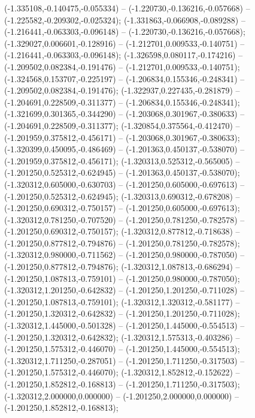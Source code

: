  (-1.335108,-0.140475,-0.055334) -- (-1.220730,-0.136216,-0.057668) -- (-1.225582,-0.209302,-0.025324);
 (-1.331863,-0.066908,-0.089288) -- (-1.216441,-0.063303,-0.096148) -- (-1.220730,-0.136216,-0.057668);
 (-1.329027,0.006601,-0.128916) -- (-1.212701,0.009533,-0.140751) -- (-1.216441,-0.063303,-0.096148);
 (-1.326598,0.080117,-0.174216) -- (-1.209502,0.082384,-0.191476) -- (-1.212701,0.009533,-0.140751);
 (-1.324568,0.153707,-0.225197) -- (-1.206834,0.155346,-0.248341) -- (-1.209502,0.082384,-0.191476);
 (-1.322937,0.227435,-0.281879) -- (-1.204691,0.228509,-0.311377) -- (-1.206834,0.155346,-0.248341);
 (-1.321699,0.301365,-0.344290) -- (-1.203068,0.301967,-0.380633) -- (-1.204691,0.228509,-0.311377);
 (-1.320854,0.375564,-0.412470) -- (-1.201959,0.375812,-0.456171) -- (-1.203068,0.301967,-0.380633);
 (-1.320399,0.450095,-0.486469) -- (-1.201363,0.450137,-0.538070) -- (-1.201959,0.375812,-0.456171);
 (-1.320313,0.525312,-0.565005) -- (-1.201250,0.525312,-0.624945) -- (-1.201363,0.450137,-0.538070);
 (-1.320312,0.605000,-0.630703) -- (-1.201250,0.605000,-0.697613) -- (-1.201250,0.525312,-0.624945);
 (-1.320313,0.690312,-0.678208) -- (-1.201250,0.690312,-0.750157) -- (-1.201250,0.605000,-0.697613);
 (-1.320312,0.781250,-0.707520) -- (-1.201250,0.781250,-0.782578) -- (-1.201250,0.690312,-0.750157);
 (-1.320312,0.877812,-0.718638) -- (-1.201250,0.877812,-0.794876) -- (-1.201250,0.781250,-0.782578);
 (-1.320312,0.980000,-0.711562) -- (-1.201250,0.980000,-0.787050) -- (-1.201250,0.877812,-0.794876);
 (-1.320312,1.087813,-0.686294) -- (-1.201250,1.087813,-0.759101) -- (-1.201250,0.980000,-0.787050);
 (-1.320312,1.201250,-0.642832) -- (-1.201250,1.201250,-0.711028) -- (-1.201250,1.087813,-0.759101);
 (-1.320312,1.320312,-0.581177) -- (-1.201250,1.320312,-0.642832) -- (-1.201250,1.201250,-0.711028);
 (-1.320312,1.445000,-0.501328) -- (-1.201250,1.445000,-0.554513) -- (-1.201250,1.320312,-0.642832);
 (-1.320312,1.575313,-0.403286) -- (-1.201250,1.575312,-0.446070) -- (-1.201250,1.445000,-0.554513);
 (-1.320312,1.711250,-0.287051) -- (-1.201250,1.711250,-0.317503) -- (-1.201250,1.575312,-0.446070);
 (-1.320312,1.852812,-0.152622) -- (-1.201250,1.852812,-0.168813) -- (-1.201250,1.711250,-0.317503);
 (-1.320312,2.000000,0.000000) -- (-1.201250,2.000000,0.000000) -- (-1.201250,1.852812,-0.168813);
